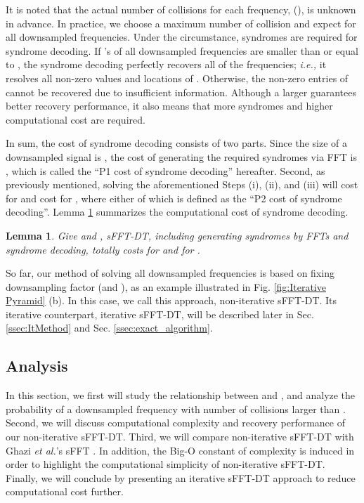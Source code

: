 \documentclass[journal,onecolumn,11pt]{IEEEtran}
\newtheorem{lemma}{Lemma}
\begin{document}
It is noted that the actual number of collisions for each frequency,  (), is unknown in advance.
In practice, we choose a maximum number of collision  and expect  for all downsampled frequencies. Under the circumstance,  syndromes are required for syndrome decoding.
If 's of all downsampled frequencies are smaller than or equal to , the syndrome decoding perfectly recovers all of the frequencies; {\em i.e.,} it resolves all non-zero values and locations of .
Otherwise, the non-zero entries of  cannot be recovered due to insufficient information.
Although a larger  guarantees better recovery performance, it also means that more syndromes and higher computational cost are required.

In sum, the cost of syndrome decoding consists of two parts. Since the size of a downsampled signal is , the cost of generating the required syndromes via FFT is , which is called the ``P1 cost of syndrome decoding'' hereafter.
Second, as previously mentioned, solving the aforementioned Steps (i), (ii), and (iii) will cost  for  and cost  for , where either of which is defined as the ``P2 cost of syndrome decoding''.
Lemma \ref{lemma:cost of non-iterative sFFT-DT} summarizes the computational cost of syndrome decoding.
\begin{lemma}
\label{lemma:cost of non-iterative sFFT-DT}
Give  and , sFFT-DT, including generating syndromes by FFTs and syndrome decoding, totally costs  for  and  for .
\end{lemma}

So far, our method of solving all downsampled frequencies is based on fixing downsampling factor  (and ), as an example illustrated in Fig. \ref{fig:Iterative Pyramid} (b).
In this case, we call this approach, non-iterative sFFT-DT.
Its iterative counterpart, iterative sFFT-DT,
will be described later in Sec. \ref{ssec:ItMethod} and Sec. \ref{ssec:exact_algorithm}.



\subsection{Analysis}\label{ssec:howtochoose_a_and_d}

In this section, we first will study the relationship between  and , and analyze the probability of a downsampled frequency with number of collisions larger than .
Second, we will discuss computational complexity and recovery performance of our non-iterative sFFT-DT.
Third, we will compare non-iterative sFFT-DT with Ghazi {\em et al.}'s sFFT \cite{Ghazi2013}.
In addition, the Big-O constant of complexity is induced in order to highlight the computational simplicity of non-iterative sFFT-DT.
Finally, we will conclude by presenting an iterative sFFT-DT approach to reduce computational cost further.
\end{document}
